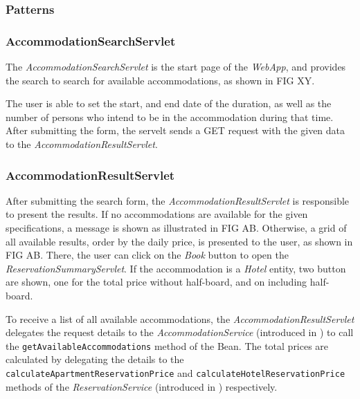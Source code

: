 \subsubsection{Patterns}

\subsubsection{AccommodationSearchServlet}\label{sec:02_impl_web_search}
The \textit{AccommodationSearchServlet} is the start page of the \textit{WebApp}, and provides the search to search for available accommodations, as shown in FIG XY.

The user is able to set the start, and end date of the duration, as well as the number of persons who intend to be in the accommodation during that time.
After submitting the form, the servelt sends a GET request with the given data to the \textit{AccommodationResultServlet}.

\subsubsection{AccommodationResultServlet}\label{sec:02_impl_web_results}
After submitting the search form, the \textit{AccommodationResultServlet} is responsible to present the results.
If no accommodations are available for the given specifications, a message is shown as illustrated in FIG AB.
Otherwise, a grid of all available results, order by the daily price, is presented to the user, as shown in FIG AB. There, the user can click on the \textit{Book} button to open the \textit{ReservationSummaryServlet}. If the accommodation is a \textit{Hotel} entity, two button are shown, one for the total price without half-board, and on including half-board.

To receive a list of all available accommodations, the \textit{AccommodationResultServlet} delegates the request details to the \textit{AccommodationService} (introduced in ) to call the \texttt{getAvailableAccommodations} method of the Bean.
The total prices are calculated by delegating the details to the \texttt{calculateApartmentReservationPrice} and \texttt{calculateHotelReservationPrice} methods of the \textit{ReservationService} (introduced in ) respectively.

